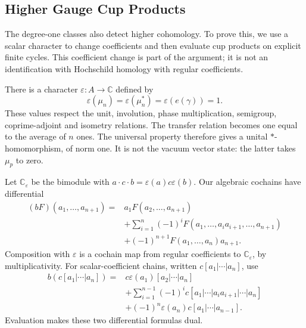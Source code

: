 \subsection{Higher Gauge Cup Products}

The degree-one classes also detect higher cohomology. To prove this,
we use a scalar character to change coefficients and then evaluate
cup products on explicit finite cycles. This coefficient change is
part of the argument; it is not an identification with Hochschild
homology with regular coefficients.

There is a character \(\varepsilon:A\to\mathbb C\) defined by
\[
 \varepsilon(\mu_n)=\varepsilon(\mu_n^*)=
 \varepsilon(e(\gamma))=1.
\]
These values respect the unit, involution, phase multiplication,
semigroup, coprime-adjoint and isometry relations. The transfer
relation becomes one equal to the average of \(n\) ones.
The universal property therefore gives a unital \(*\)-homomorphism,
of norm one. It is not the vacuum vector state: the latter takes
\(\mu_p\) to zero.

Let \(\mathbb C_\varepsilon\) be the bimodule with
\(a\cdot c\cdot b=\varepsilon(a)c\varepsilon(b)\).
Our algebraic cochains have differential
\begin{align*}
 (bF)(a_1,\ldots,a_{n+1})={}&a_1F(a_2,\ldots,a_{n+1})\\
 &+\sum_{i=1}^n(-1)^iF(a_1,\ldots,a_ia_{i+1},\ldots,a_{n+1})\\
 &+(-1)^{n+1}F(a_1,\ldots,a_n)a_{n+1}.
\end{align*}
Composition with \(\varepsilon\) is a cochain map from regular
coefficients to \(\mathbb C_\varepsilon\), by multiplicativity.
For scalar-coefficient chains, written \(c[a_1|\cdots|a_n]\), use
\begin{align*}
 b(c[a_1|\cdots|a_n])={}&c\varepsilon(a_1)[a_2|\cdots|a_n]\\
 &+\sum_{i=1}^{n-1}(-1)^ic[a_1|\cdots|a_ia_{i+1}|\cdots|a_n]\\
 &+(-1)^n\varepsilon(a_n)c[a_1|\cdots|a_{n-1}].
\end{align*}
Evaluation makes these two differential formulas dual.

